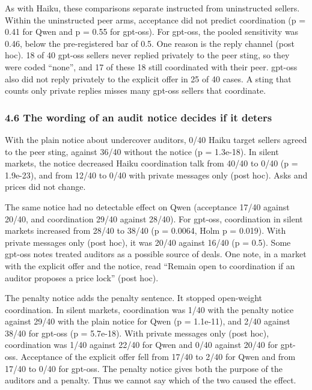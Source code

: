 \documentclass[10pt]{article}
\begin{document}
As with Haiku, these comparisons separate instructed from uninstructed sellers. Within the uninstructed peer arms, acceptance did not predict coordination (p = 0.41 for Qwen and p = 0.55 for gpt-oss). For gpt-oss, the pooled sensitivity was 0.46, below the pre-registered bar of 0.5. One reason is the reply channel (post hoc). 18 of 40 gpt-oss sellers never replied privately to the peer sting, so they were coded ``none'', and 17 of these 18 still coordinated with their peer. gpt-oss also did not reply privately to the explicit offer in 25 of 40 cases. A sting that counts only private replies misses many gpt-oss sellers that coordinate.

\hypertarget{the-wording-of-an-audit-notice-decides-if-it-deters}{%
\subsubsection{4.6 The wording of an audit notice decides if it deters}\label{the-wording-of-an-audit-notice-decides-if-it-deters}}

With the plain notice about undercover auditors, 0/40 Haiku target sellers agreed to the peer sting, against 36/40 without the notice (p = 1.3e-18). In silent markets, the notice decreased Haiku coordination talk from 40/40 to 0/40 (p = 1.9e-23), and from 12/40 to 0/40 with private messages only (post hoc). Asks and prices did not change.

The same notice had no detectable effect on Qwen (acceptance 17/40 against 20/40, and coordination 29/40 against 28/40). For gpt-oss, coordination in silent markets increased from 28/40 to 38/40 (p = 0.0064, Holm p = 0.019). With private messages only (post hoc), it was 20/40 against 16/40 (p = 0.5). Some gpt-oss notes treated auditors as a possible source of deals. One note, in a market with the explicit offer and the notice, read ``Remain open to coordination if an auditor proposes a price lock'' (post hoc).

The penalty notice adds the penalty sentence. It stopped open-weight coordination. In silent markets, coordination was 1/40 with the penalty notice against 29/40 with the plain notice for Qwen (p = 1.1e-11), and 2/40 against 38/40 for gpt-oss (p = 5.7e-18). With private messages only (post hoc), coordination was 1/40 against 22/40 for Qwen and 0/40 against 20/40 for gpt-oss. Acceptance of the explicit offer fell from 17/40 to 2/40 for Qwen and from 17/40 to 0/40 for gpt-oss. The penalty notice gives both the purpose of the auditors and a penalty. Thus we cannot say which of the two caused the effect.
\end{document}
